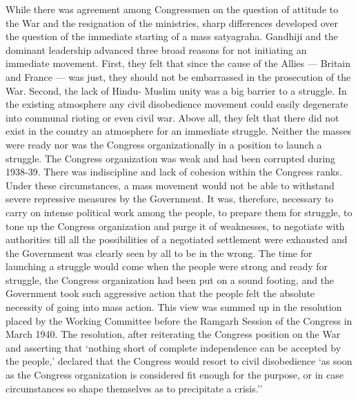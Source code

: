 While there was agreement among Congressmen on the question of attitude to the War and the resignation of the ministries, sharp differences developed over the question of the immediate starting of a mass satyagraha. Gandhiji and the dominant leadership advanced three broad reasons for not initiating an immediate movement. First, they felt that since the cause of the Allies — Britain and France — was just, they should not be embarrassed in the prosecution of the War. Second, the lack of Hindu- Muslim unity was a big barrier to a struggle. In the existing atmosphere any civil disobedience movement could easily degenerate into communal rioting or even civil war. Above all, they felt that there did not exist in the country an atmosphere for an immediate struggle. Neither the masses were ready nor was the Congress organizationally in a position to launch a struggle. The Congress organization was weak and had been corrupted during 1938-39. There was indiscipline and lack of cohesion within the Congress ranks. Under these circumstances, a mass movement would not be able to withstand severe repressive measures by the Government. It was, therefore, necessary to carry on intense political work among the people, to prepare them for struggle, to tone up the Congress organization and purge it of weaknesses, to negotiate with authorities till all the possibilities of a negotiated settlement were exhausted and the Government was clearly seen by all to be in the wrong. The time for launching a struggle would come when the people were strong and ready for struggle, the Congress organization had been put on a sound footing, and the Government took such aggressive action that the people felt the absolute necessity of going into mass action. This view was summed up in the resolution placed by the Working Committee before the Ramgarh Session of the Congress in March 1940. The resolution, after reiterating the Congress position on the War and asserting that `nothing short of complete independence can be accepted by the people,' declared that the Congress would resort to civil disobedience `as soon as the Congress organization is considered fit enough for the purpose, or in case circumstances so shape themselves as to precipitate a crisis.'' 

